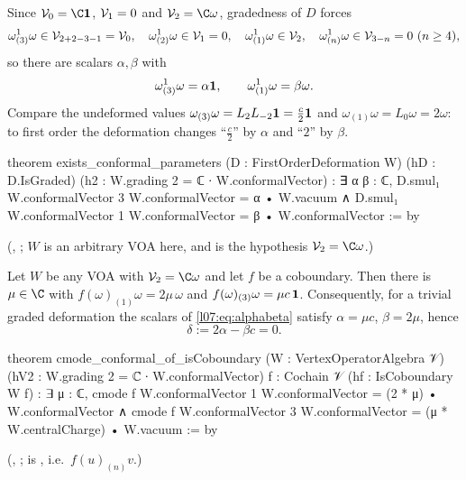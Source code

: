 Since $\lsevenV_0 = \C\lsevenvac$, $\mathcal{V}_1 = 0$ and $\lsevenV_2 = \C\omega$, gradedness of $D$ forces
\begin{equation*}
 \omega^1_{(3)}\omega\in\mathcal{V}_{2+2-3-1} = \mathcal{V}_0,\quad
 \omega^1_{(2)}\omega\in\mathcal{V}_1 = 0,\quad
 \omega^1_{(1)}\omega\in\mathcal{V}_2,\quad
 \omega^1_{(n)}\omega\in\mathcal{V}_{3-n} = 0\ (n\ge4),
\end{equation*}
so there are scalars $\alpha,\beta$ with
\begin{equation}\label{l07:eq:alphabeta}
 \omega^1_{(3)}\omega = \alpha\mathbf{1},\qquad \omega^1_{(1)}\omega = \beta\omega .
\end{equation}
Compare the undeformed values $\omega_{(3)}\omega = L_2L_{-2}\mathbf{1} = \frac c2\mathbf{1}$ and
$\omega_{(1)}\omega = L_0\omega = 2\omega$: to first order the deformation changes ``$\frac c2$'' by
$\alpha$ and ``$2$'' by $\beta$.
\begin{leancode}
theorem exists_conformal_parameters (D : FirstOrderDeformation W) (hD : D.IsGraded)
    (h2 : W.grading 2 = ℂ ∙ W.conformalVector) :
    ∃ α β : ℂ,
      D.smul₁ W.conformalVector 3 W.conformalVector = α • W.vacuum ∧
      D.smul₁ W.conformalVector 1 W.conformalVector = β • W.conformalVector := by
\end{leancode}
(, ;
$W$ is an arbitrary VOA here, and  is the hypothesis $\lsevenV_2 = \C\omega$.)

\begin{theorem}\label{l07:thm:gaugeline}
Let $W$ be any VOA with $\lsevenV_2 = \C\omega$ and let $f$ be a coboundary. Then there is $\mu\in\C$
with $f(\omega)_{(1)}\omega = 2\mu\,\omega$ and $f(\omega)_{(3)}\omega = \mu c\,\mathbf{1}$. Consequently, for a
trivial graded deformation the scalars of \eqref{l07:eq:alphabeta} satisfy $\alpha = \mu c$,
$\beta = 2\mu$, hence
\begin{equation}\label{l07:eq:delta-def}
 \delta := 2\alpha - \beta c = 0 .
\end{equation}
\end{theorem}
\begin{leancode}
theorem cmode_conformal_of_isCoboundary (W : VertexOperatorAlgebra 𝒱)
    (hV2 : W.grading 2 = ℂ ∙ W.conformalVector) {f : Cochain 𝒱} (hf : IsCoboundary W f) :
    ∃ μ : ℂ,
      cmode f W.conformalVector 1 W.conformalVector = (2 * μ) • W.conformalVector ∧
      cmode f W.conformalVector 3 W.conformalVector = (μ * W.centralCharge) • W.vacuum := by
\end{leancode}
(, ;
 is , i.e.\ $f(u)_{(n)}v$.)

